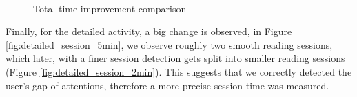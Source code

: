 \begin{figure}[!htb]
	\myfloatalign
	 \quad 
	 \\
	\caption{Total time improvement comparison}\label{fig:total_time_comparison}
\end{figure}

Finally, for the detailed activity, a big change is observed, in Figure \ref{fig:detailed_session_5min}, we observe roughly two smooth reading sessions, which later, with a finer session detection gets split into smaller reading sessions (Figure \ref{fig:detailed_session_2min}). This suggests that we correctly detected the user's gap of attentions, therefore a more precise session time was measured.

